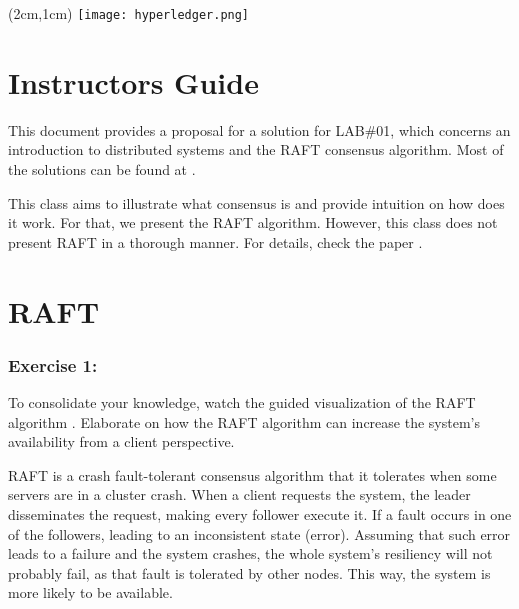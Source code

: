 \documentclass[12pt,a4paper]{article}
\begin{document}
\textblockorigin{-34pt}{-12pt}
\begin{textblock*}{10cm}(2cm,1cm)
\texttt{[image: hyperledger.png]}
\end{textblock*}

\section*{Instructors Guide}
This document provides a proposal for a solution for LAB\#01, which concerns an introduction to distributed systems and the RAFT consensus algorithm. Most of the solutions can be found at \cite{raft_paper, Ousterhout_presentation, raft_viz,raft_homepage}.

This class aims to illustrate what consensus is and provide intuition on how does it work. For that, we present the RAFT algorithm. However, this class does not present RAFT in a thorough manner. For details, check the paper \cite{raft_paper}.



\section{RAFT}
\label{sec:RAFT}

\subsubsection*{Exercise 1:} To consolidate your knowledge, watch the guided visualization of the RAFT algorithm \cite{raft_viz}.
Elaborate on how the RAFT algorithm can increase the system's availability from a client perspective.

RAFT is a crash fault-tolerant consensus algorithm that it tolerates when some servers are in a cluster crash. When a client requests the system, the leader disseminates the request, making every follower execute it. If a fault occurs in one of the followers, leading to an inconsistent state (error). Assuming that such error leads to a failure and the system crashes, the whole system's resiliency will not probably fail, as that fault is tolerated by other nodes. This way, the system is more likely to be available.
\end{document}
